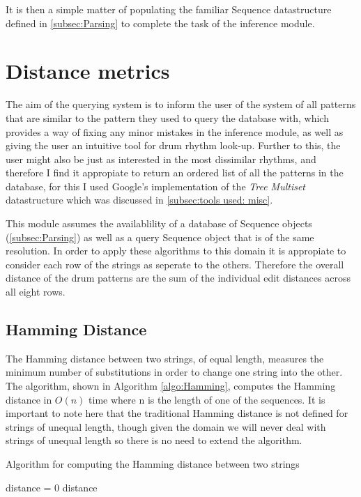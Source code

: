 \documentclass[12pt,twoside,notitlepage]{report}
\begin{document}
		It is then a simple matter of populating the familiar Sequence datastructure defined in \ref{subsec:Parsing}	to complete the task of the inference module.
	\section{Distance metrics}\label{sec:Distance metrics}
	The aim of the querying system is to inform the user of the system of all patterns that are similar to the pattern they used to query the database with, which provides a way of fixing any minor mistakes in the inference module, as well as giving the user an intuitive tool for drum rhythm look-up. Further to this, the user might also be just as interested in the most dissimilar rhythms, and therefore I find it appropiate to return an ordered list of all the patterns in the database, for this I used Google's implementation of the \emph{Tree Multiset} datastructure which was discussed in \ref{subsec:tools used: misc}.
	
	This module assumes the availablility of a database of Sequence objects (\ref{subsec:Parsing}) as well as a query Sequence object that is of the same resolution. In order to apply these algorithms to this domain it is appropiate to consider each row of the strings as seperate to the others. Therefore the overall distance of the drum patterns are the sum of the individual edit distances across all eight rows.
	
	\subsection{Hamming Distance}
		The Hamming distance\cite{Hamming1950} between two strings, of equal length, measures the minimum number of substitutions in order to change one string into the other. The algorithm, shown in Algorithm \ref{algo:Hamming}, computes the Hamming distance in $O(n)$ time where n is the length of one of the sequences. It is important to note here that the traditional Hamming distance is not defined for strings of unequal length, though given the domain we will never deal with strings of unequal length so there is no need to extend the algorithm.
		\begin{algorithm}
			\caption{Algorithm for computing the Hamming distance between two strings}
			\label{algo:Hamming}
			\begin{algorithmic}[1]
				\State distance = 0
					\EndIf
				\EndFor
				\State \Return distance
			\EndProcedure
			\end{algorithmic}
		\end{algorithm}
		
\end{document}

